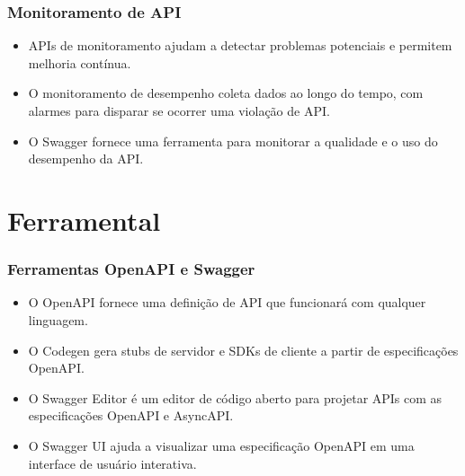 \documentclass{beamer}
\begin{document}
\begin{frame}
\frametitle{Monitoramento de API}


\begin{itemize}
\item APIs de monitoramento ajudam a detectar problemas potenciais e permitem melhoria contínua.
\item O monitoramento de desempenho coleta dados ao longo do tempo, com alarmes para disparar se ocorrer uma violação de API.
\item O Swagger fornece uma ferramenta para monitorar a qualidade e o uso do desempenho da API.
\end{itemize}

\end{frame}

\section{Ferramental}

\begin{frame}
\frametitle{Ferramentas OpenAPI e Swagger}



\begin{itemize}
  \item O OpenAPI fornece uma definição de API que funcionará com qualquer linguagem.
  \item O Codegen gera stubs de servidor e SDKs de cliente a partir de especificações OpenAPI.
  \item O Swagger Editor é um editor de código aberto para projetar APIs com as especificações OpenAPI e AsyncAPI.
  \item O Swagger UI ajuda a visualizar uma especificação OpenAPI em uma interface de usuário interativa.
\end{itemize}

\end{frame}
\end{document}
